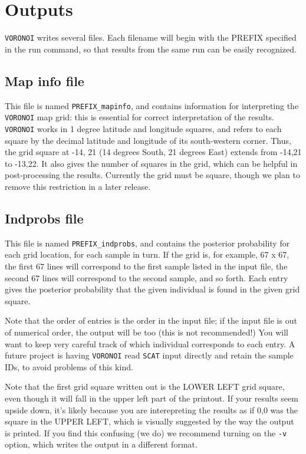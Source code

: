 \documentclass[10pt,titlepage,times,letterpaper]{article}
\def\SCAT{{\tt SCAT} }
\def\VORONOI{{\tt VORONOI} }
\begin{document}
\section{Outputs}

\VORONOI writes several files. Each filename will begin with the PREFIX
specified in the run command, so that results from the same run can be easily
recognized.


\subsection{Map info file}

This file is named {\tt PREFIX\_mapinfo}, and contains information for interpreting the
\VORONOI map grid:  this is essential for correct interpretation of the results.
\VORONOI works in 1 degree latitude and longitude squares, and refers to each
square by the decimal latitude and longitude of its south-western corner.  Thus,
the grid square at -14, 21 (14 degrees South, 21 degrees East) extends from -14,21
to -13,22.  It also gives the number of squares in the grid, which can be helpful
in post-processing the results.  Currently the grid must be square, though we plan
to remove this restriction in a later release.

\subsection{Indprobs file}

This file is named {\tt PREFIX\_indprobs}, and contains the posterior probability
for each grid location, for each sample in turn. If the grid is, for example, 67 x 67,
the first 67 lines will correspond to the first sample listed in the input file,
the second 67 lines will correspond to the second sample, and so forth.  Each entry
gives the posterior probability that the given individual is found in the given
grid square.

Note that the order of entries is the order in the input file; if the input file is
out of numerical order, the output will be too (this is not recommended!)  You
will want to keep very careful track of which individual corresponds to each entry.
A future project is having \VORONOI read \SCAT input directly and retain the sample
IDs, to avoid problems of this kind.

Note that the first grid square written out is the LOWER LEFT grid square, even though
it will fall in the upper left part of the printout.  If your results seem upside
down, it's likely because you are interepreting the results as if 0,0 was the square
in the UPPER LEFT, which is visually suggested by the way the output is printed.
If you find this confusing (we do) we recommend turning on the {\tt -v} option,
which writes the output in a different format.
\end{document}

